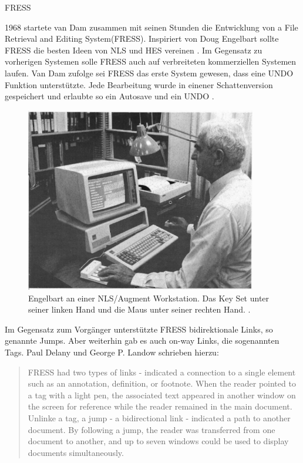 \begin{section}{FRESS}
\label{sec:fress}
	
1968 startete van Dam zusammen mit seinen Stunden die Entwicklung von \glqq a File Retrieval and Editing System\grqq{ }(FRESS). Inspiriert von Doug Engelbart sollte FRESS die besten Ideen von NLS und HES vereinen \cite[S.887 und 890]{Dam1988}. Im Gegensatz zu vorherigen Systemen solle FRESS auch auf verbreiteten kommerziellen Systemen laufen. Van Dam zufolge sei FRESS das erste System gewesen, dass eine UNDO Funktion unterstützte. Jede Bearbeitung wurde in einener Schattenversion gespeichert und erlaubte so ein Autosave und ein UNDO \cite[S.891]{Dam1988}.

\begin{figure}[H]
	\centering
	\includegraphics[width=0.9\textwidth]{image/augment}
	\caption{Engelbart an einer NLS/Augment Workstation. Das Key Set unter seiner linken Hand und die Maus unter seiner rechten Hand. \cite{Conklin1987}.}
	\label{fig:augment}
\end{figure}

Im Gegensatz zum Vorgänger unterstützte FRESS bidirektionale Links, so genannte \glqq Jumps\grqq{ }. Aber weiterhin gab es auch on-way Links, die sogenannten \glqq Tags\grqq{ }. Paul Delany und George P. Landow schrieben hierzu: 

\begin{quote}
\glqq FRESS had two types of links - indicated a connection to a single element such as an annotation, definition, or footnote. When the reader pointed to a tag with a light pen, the associated text appeared in another window on the screen for reference while the reader remained in the main document. Unlinke a tag, a jump - a bidirectional link - indicated a path to another document. By following a jump, the reader was transferred from one document to another, and up to seven windows could be used to display documents simultaneously. \grqq{ }\cite[S.68]{GeorgeLandow1995}
\end{quote}


\end{section}
